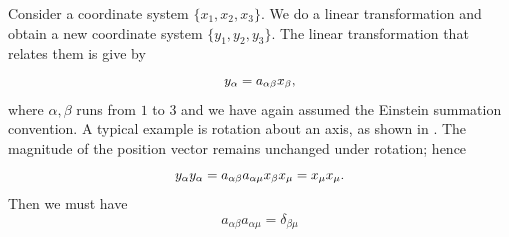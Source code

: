 \begin{subappendices}
Consider a coordinate system $\{x_1,x_2,x_3\}$. We do a linear
transformation and obtain a new coordinate system
$\{y_1,y_2,y_3\}$. The linear transformation that relates them is give
by 
\begin{equation}
y_{\alpha} = a_{\alpha\beta} x_{\beta}\/,
\label{eq:transform}
\end{equation}
where $\alpha,\beta$ runs from $1$ to $3$ and we have again assumed
 the Einstein summation convention. A typical example is rotation about
 an axis, as shown in . 
The magnitude of the position vector remains unchanged under rotation;
hence
\begin{equation}
y_{\alpha}y_{\alpha} = a_{\alpha\beta}a_{\alpha\mu} x_{\beta}x_{\mu}
= x_{\mu}x_{\mu} \/.
\end{equation}
Then we must have 
\begin{equation}
a_{\alpha\beta}a_{\alpha\mu} = \delta_{\beta\mu}
\label{eq:delta}
\end{equation}

\end{subappendices}

